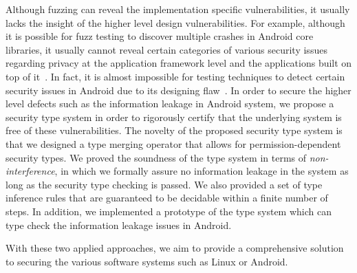 Although fuzzing can reveal the implementation specific vulnerabilities, it usually lacks the insight of the higher level design vulnerabilities. For example, although it is possible for fuzz testing to discover multiple crashes in Android core libraries, it usually cannot reveal certain categories of various security issues regarding privacy at the application framework level and the applications built on top of it~\cite{Enck:2009:UAS:1512148.1512324,Ernst:2014}. In fact, it is almost impossible for testing techniques to detect certain security issues in Android due to its designing flaw~\cite{url:android-flaw}. In order to secure the higher level defects such as the information leakage in Android system, we propose a security type system in order to rigorously certify that the underlying system is free of these vulnerabilities. The novelty of the proposed security type system is that we designed a type merging operator that allows for permission-dependent security types. We proved the soundness of the type system in terms of \emph{non-interference}, in which we formally assure no information leakage in the system as long as the security type checking is passed. We also provided a set of type inference rules that are guaranteed to be decidable within a finite number of steps. In addition, we implemented a prototype of the type system which can type check the information leakage issues in Android.

With these two applied approaches, we aim to provide a comprehensive solution to securing the various software systems such as Linux or Android.

